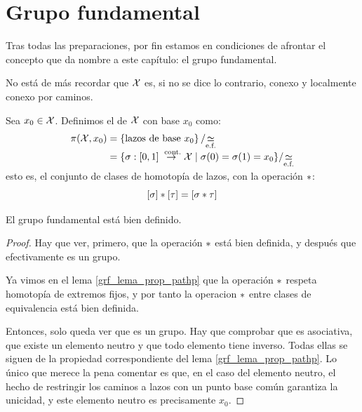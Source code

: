 \section{Grupo fundamental}

Tras todas las preparaciones, por fin estamos en condiciones de afrontar el concepto que da nombre a este capítulo: el grupo fundamental.

No está de más recordar que $\mathcal{X}$ es, si no se dice lo contrario, conexo y localmente conexo por caminos.

\begin{defi}
	Sea $x_0\in\mathcal{X}$. Definimos el  de $\mathcal{X}$ con base $x_0$ como:
	\[\begin{split}
	\pi(\mathcal{X},x_0) &= \left\{\text{lazos de base } x_0\right\} / {\mathrel{\smash{\underset{\text{e.f.}}{\simeq}}}} \\
	&=\{\sigma:[0,1]\overset{\text{ cont.}}{\to}\mathcal{X} \mid \sigma(0)=\sigma(1)=x_0\} / {\mathrel{\smash{\underset{\text{e.f.}}{\simeq}}}}
	\end{split}\]
	esto es, el conjunto de clases de homotopía de lazos, con la operación ${\mathbin{*}}$:
	\[\left [ \sigma \right ]\mathbin{*}\left [ \tau \right ] = \left [ \sigma\mathbin{*}\tau \right ]\]
\end{defi}

\begin{lem}
	El grupo fundamental está bien definido.
	
	\begin{proof}
	Hay que ver, primero, que la operación ${\mathbin{*}}$ está bien definida, y después que efectivamente es un grupo.
	
	Ya vimos en el lema \ref{grf_lema_prop_pathp} que la operación ${\mathbin{*}}$ respeta homotopía de extremos fijos, y por tanto la operacion ${\mathbin{*}}$ entre clases de equivalencia está bien definida.
	
	Entonces, solo queda ver que es un grupo. Hay que comprobar que es asociativa, que existe un elemento neutro y que todo elemento tiene inverso. Todas ellas se siguen de la propiedad correspondiente del lema \ref{grf_lema_prop_pathp}. Lo único que merece la pena comentar es que, en el caso del elemento neutro, el hecho de restringir los caminos a lazos con un punto base común garantiza la unicidad, y este elemento neutro es precisamente $x_0$.
	\end{proof}
\end{lem}

